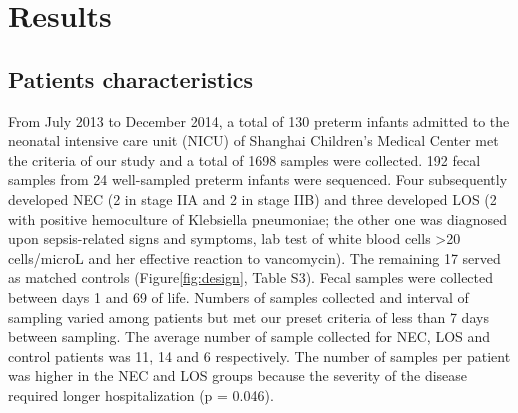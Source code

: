 \documentclass[fleqn,10pt]{wlpeerj} %
\begin{document}
\section*{Results}
  \subsection*{Patients characteristics}
   From July 2013 to December 2014, a total of 130 preterm infants admitted to the neonatal intensive care unit (NICU) of Shanghai Children’s Medical Center met the criteria of our study and a total of 1698 samples were collected. 192 fecal samples from 24 well-sampled preterm infants were sequenced. Four subsequently developed NEC (2 in stage IIA and 2 in stage IIB) and three developed LOS (2 with positive hemoculture of Klebsiella pneumoniae; the other one was diagnosed upon sepsis-related signs and symptoms, lab test of white blood cells \textgreater 20 cells/microL and her effective reaction to vancomycin).  The remaining 17 served as matched controls (Figure\ref{fig:design}, Table S3). Fecal samples were collected between days 1 and 69 of life. Numbers of samples collected and interval of sampling varied among patients but met our preset criteria of less than 7 days between sampling. The average number of sample collected for NEC, LOS and control patients was 11, 14 and 6 respectively. The number of samples per patient was higher in the NEC and LOS groups because the severity of the disease required longer hospitalization (p = 0.046).

\end{document}
